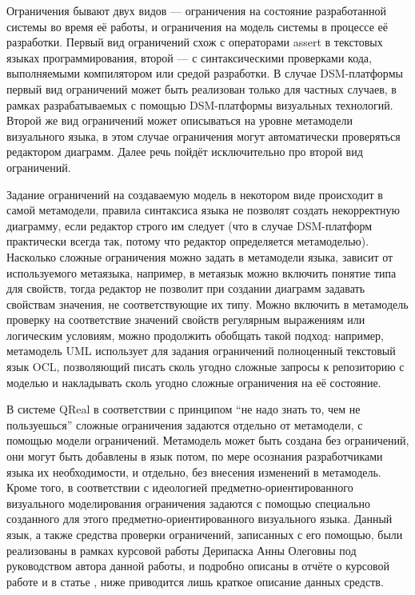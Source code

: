 Ограничения бывают двух видов --- ограничения на состояние разработанной системы во 
время её работы, и ограничения на модель системы в процессе её разработки. Первый 
вид ограничений схож с операторами assert в текстовых языках программирования, второй --- 
с синтаксическими проверками кода, выполняемыми компилятором или средой разработки. 
В случае DSM-платформы первый вид ограничений может быть реализован только для частных 
случаев, в рамках разрабатываемых с помощью DSM-платформы визуальных технологий. Второй 
же вид ограничений может описываться на уровне метамодели визуального языка, в этом 
случае ограничения могут автоматически проверяться редактором диаграмм. Далее речь 
пойдёт исключительно про второй вид ограничений.

Задание ограничений на создаваемую модель в некотором виде происходит в самой метамодели, 
правила синтаксиса языка не позволят создать некорректную диаграмму, если редактор строго 
им следует (что в случае DSM-платформ практически всегда так, потому что редактор 
определяется метамоделью). Насколько сложные ограничения можно задать в метамодели 
языка, зависит от используемого метаязыка, например, в метаязык можно включить понятие 
типа для свойств, тогда редактор не позволит при создании диаграмм задавать свойствам 
значения, не соответствующие их типу. Можно включить в метамодель проверку на соответствие 
значений свойств регулярным выражениям или логическим условиям, можно продолжить обобщать 
такой подход: например, метамодель UML использует для задания ограничений полноценный 
текстовый язык OCL, позволяющий писать сколь угодно сложные запросы к репозиторию с 
моделью и накладывать сколь угодно сложные ограничения на её состояние.

В системе QReal в соответствии с принципом "`не надо знать то, чем не пользуешься"' 
сложные ограничения задаются отдельно от метамодели, с помощью модели ограничений. 
Метамодель может быть создана без ограничений, они могут быть добавлены в язык потом,
по мере осознания разработчиками языка их необходимости, и отдельно, без внесения 
изменений в метамодель. Кроме того, в соответствии с идеологией предметно-ориентированного 
визуального моделирования ограничения задаются с помощью специально созданного для 
этого предметно-ориентированного визуального языка. Данный язык, а также средства 
проверки ограничений, записанных с его помощью, были реализованы в рамках курсовой 
работы Дерипаска Анны Олеговны 
под руководством автора данной работы, и подробно описаны в отчёте о курсовой работе и в статье
, ниже приводится лишь краткое описание данных средств.

